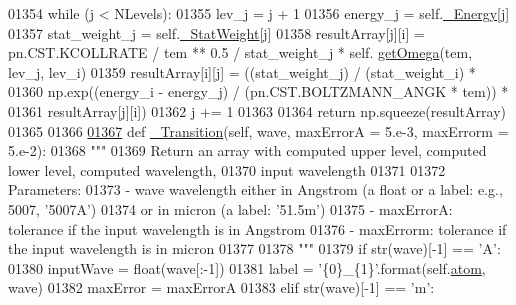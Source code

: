 \begin{DoxyCode}
{{01354             \textcolor{keywordflow}{while} (j < NLevels):
01355                 lev\_j = j + 1 
01356                 energy\_j = self.\hyperlink{classpyneb_1_1core_1_1pynebcore_1_1_atom_a52e68715246d258bf0a14f4bd06e89e4}{\_Energy}[j]
01357                 stat\_weight\_j = self.\hyperlink{classpyneb_1_1core_1_1pynebcore_1_1_atom_a1e76c66b89eb327aeb4cdb1d8bd46fb5}{\_StatWeight}[j]
01358                 resultArray[j][i] = pn.CST.KCOLLRATE / tem ** 0.5 / stat\_weight\_j * self.
      \hyperlink{classpyneb_1_1core_1_1pynebcore_1_1_atom_ae133eed382e284df01f2183da341534b}{getOmega}(tem, lev\_j, lev\_i)
01359                 resultArray[i][j] = ((stat\_weight\_j) / (stat\_weight\_i) * 
01360                                       np.exp((energy\_i - energy\_j) / (pn.CST.BOLTZMANN\_ANGK * tem)) * 
01361                                       resultArray[j][i])
01362                 j += 1
01363         
01364         \textcolor{keywordflow}{return} np.squeeze(resultArray)
01365 
01366     
\hypertarget{pynebcore_8py_source_l01367}{}\hyperlink{classpyneb_1_1core_1_1pynebcore_1_1_atom_a69f29cc10c77910841f9e3ff8ddef250}{01367}     \textcolor{keyword}{def }\hyperlink{classpyneb_1_1core_1_1pynebcore_1_1_atom_a69f29cc10c77910841f9e3ff8ddef250}{\_Transition}(self, wave, maxErrorA = 5.e-3, maxErrorm = 5.e-2):
01368         \textcolor{stringliteral}{"""}
01369 \textcolor{stringliteral}{        Return an array with computed upper level, computed lower level, computed wavelength, }
01370 \textcolor{stringliteral}{            input wavelength}
01371 \textcolor{stringliteral}{        }
01372 \textcolor{stringliteral}{        Parameters:}
01373 \textcolor{stringliteral}{            - wave       wavelength either in Angstrom (a float or a label: e.g., 5007, '5007A') }
01374 \textcolor{stringliteral}{                            or in micron (a label: '51.5m')}
01375 \textcolor{stringliteral}{            - maxErrorA: tolerance if the input wavelength is in Angstrom}
01376 \textcolor{stringliteral}{            - maxErrorm: tolerance if the input wavelength is in micron}
01377 \textcolor{stringliteral}{                            }
01378 \textcolor{stringliteral}{        """}
01379         \textcolor{keywordflow}{if} str(wave)[-1] == \textcolor{stringliteral}{'A'}:
01380             inputWave = float(wave[:-1])
01381             label = \textcolor{stringliteral}{'\{0\}\_\{1\}'}.format(self.\hyperlink{classpyneb_1_1core_1_1pynebcore_1_1_atom_a192f3e20446d7fba81d789bc705d6c71}{atom}, wave)
01382             maxError = maxErrorA
01383         \textcolor{keywordflow}{elif} str(wave)[-1] == \textcolor{stringliteral}{'m'}:
}}
\end{DoxyCode}
